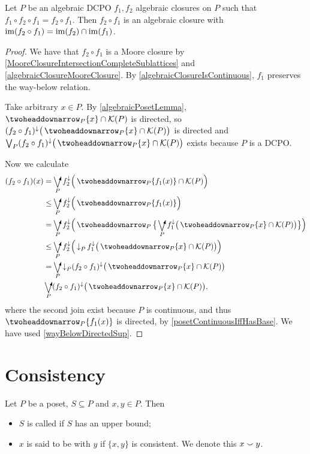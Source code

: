 \begin{proposition} \label{compositionOfAlgebraicClosuresAlgebraic}
Let $P$ be an algebraic DCPO $f_1, f_2$ algebraic closures on $P$ such that $f_1\circ f_2 \circ f_1 = f_2\circ f_1$. Then $f_2\circ f_1$ is an algebraic closure with $\operatorname{im}(f_2\circ f_1) = \operatorname{im}(f_2) \cap \operatorname{im}(f_1)$.
\end{proposition}
\begin{proof}
We have that $f_2\circ f_1$ is a Moore closure by \ref{MooreClosureIntersectionCompleteSublattices} and \ref{algebraicClosureMooreClosure}. By \ref{algebraicClosureIsContinuous}, $f_1$ preserves the way-below relation.

Take arbitrary $x\in P$. By \ref{algebraicPosetLemma}, $\ddownset_P\{x\} \cap \compacts(P)$ is directed, so $(f_2\circ f_1)^\imf\big(\ddownset_P\{x\} \cap \compacts(P)\big)$ is directed and $\bigvee_P (f_2\circ f_1)^\imf\big(\ddownset_P\{x\} \cap \compacts(P)\big)$ exists because $P$ is a DCPO.

Now we calculate
\begin{align*}
(f_2\circ f_1)(x) &= \dirvee_P f_2^\imf\Big(\ddownset_P\{f_1(x)\} \cap \compacts(P)\Big) \\
&\leq \dirvee_P f_2^\imf\Big(\ddownset_P\{f_1(x)\}\Big) \\
&= \dirvee_P f_2^\imf\Big(\ddownset_P\big\{\dirvee_P f_1^\imf\big(\ddownset_P\{x\} \cap \compacts(P)\big)\big\}\Big) \\
&\leq \dirvee_P f_2^\imf\Big(\downset_P f_1^\imf\big(\ddownset_P\{x\} \cap \compacts(P)\big)\Big) \\
&= \dirvee_P \downset_P(f_2\circ f_1)^\imf\big(\ddownset_P\{x\} \cap \compacts(P)\big) \\
& \dirvee_P (f_2\circ f_1)^\imf\big(\ddownset_P\{x\} \cap \compacts(P)\big),
\end{align*}
where the second join exist because $P$ is continuous, and thus $\ddownset_P\{f_1(x)\}$ is directed, by \ref{posetContinuousIffHasBase}. We have used \ref{wayBelowDirectedSup}.
\end{proof}

\section{Consistency}
\begin{definition}
Let $P$ be a poset, $S\subseteq P$ and $x,y\in P$. Then
\begin{itemize}
\item $S$ is called  if $S$ has an upper bound;
\item $x$ is said to be  with $y$ if $\{x,y\}$ is consistent. We denote this $x \smallsmile y$.
\end{itemize}
\end{definition}

